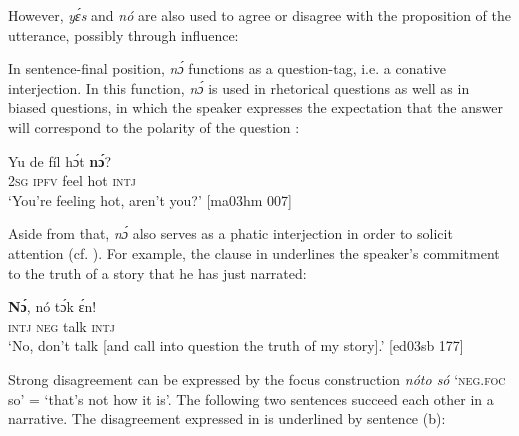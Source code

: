 However, \textit{yɛ́s} and \textit{nó} are also used to agree or disagree with the proposition of the utterance, possibly through  influence:


\ea%
    \label{ex:key:653}
\z
\z

In sentence-final position, \textit{nɔ́} functions as a question-tag, i.e. a conative interjection. In this function, \textit{nɔ́} is used in rhetorical questions as well as in biased questions, in which the speaker expresses the expectation that the answer will correspond to the polarity of the question : 


\ea%
    \label{ex:key:654}
    \gll Yu  de  fíl  hɔ́t  \textbf{nɔ́}?\\
\textsc{2sg}  \textsc{ipfv}  feel  hot  \textsc{intj}\\

\glt ‘You’re feeling hot, aren’t you?' [ma03hm 007]
\z

Aside from that, \textit{nɔ́} also serves as a phatic interjection in order to solicit attention (cf. ). For example, the clause in  underlines the speaker’s commitment to the truth of a story that he has just narrated:


\ea%
    \label{ex:key:655}
    \gll \textbf{Nɔ́},  nó  tɔ́k  ɛ́n!\\
\textsc{intj}  \textsc{neg}  talk  \textsc{intj}\\

\glt ‘No, don’t talk [and call into question the truth of my story].’ [ed03sb 177]
\z

Strong disagreement can be expressed by the focus construction \textit{nóto só} ‘\textsc{neg}.\textsc{foc} so’ = ‘that’s not how it is’. The following two sentences succeed each other in a narrative. The disagreement expressed in  is underlined by sentence (b): 


